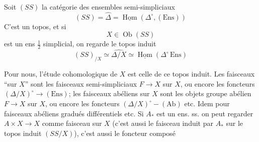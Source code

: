 
Soit $(SS)$ la catégorie des ensembles semi-simpliciaux
\[
(SS)=\widehat{\Delta}=\underline{\operatorname{Hom}}(\Delta^\circ,(\mathrm{Ens}))
\]
C'est un topos, et si
\[
X\in\operatorname{Ob}(SS)
\]
est un ens $\frac12$ simplicial, on regarde le topos induit
\[
(SS)_{/X}\simeq\widehat{\Delta/X}
\simeq\underline{\operatorname{Hom}}(\Delta^\circ\,\mathrm{Ens})
\]

Pour nous, l'étude cohomologique de $X$ est celle de ce topos induit. Les faisceaux  ``sur $X$'' sont les  faisceaux semi-simpliciaux  $F\longrightarrow X$ sur $X$, ou encore les foncteurs $(\Delta/X)^\circ\longrightarrow(\mathrm{Ens})$; les faisceaux abéliens sur $X$ sont les objets groupe abélien $F\longrightarrow X$ sur $X$, ou encore les foncteurs $(\Delta/X)^\circ\mathbin{-}(\mathrm{Ab})$ etc. Idem pour faisceaux abéliens gradués différentiels etc. Si $A_*$ est un ens. ss. on peut regarder $A\times X\longrightarrow X$ comme faisceau sur $X$ (c'est aussi le faisceau induit par $A_*$ sur le topos induit $(SS/X)$), c'est aussi le foncteur composé


